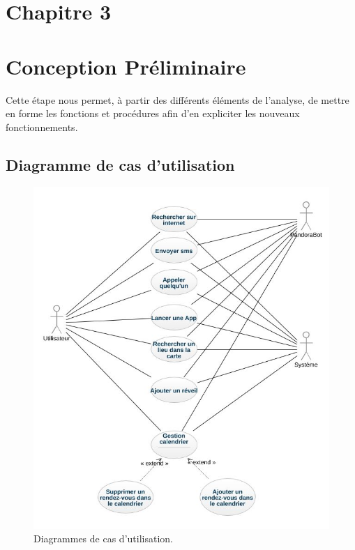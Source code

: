 \section*{Chapitre 3}
\section{Conception Préliminaire}
\indent Cette étape nous permet, à partir des différents éléments de l'analyse, de mettre en forme les fonctions et procédures afin d'en expliciter les nouveaux fonctionnements.

\subsection{Diagramme de cas d'utilisation}
\begin{figure}[h]
\centering
\includegraphics[scale=0.5]{./diagrammes/UsecaseDiagram.jpeg}
\caption{Diagrammes de cas d'utilisation.\label{fig2}}
\end{figure}

